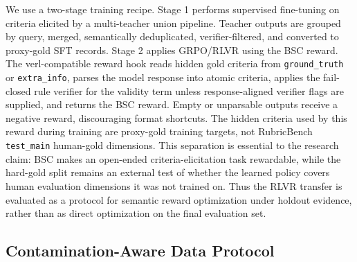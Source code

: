 We use a two-stage training recipe. Stage 1 performs supervised fine-tuning on
criteria elicited by a multi-teacher union pipeline. Teacher outputs are grouped
by query, merged, semantically deduplicated, verifier-filtered, and converted
to proxy-gold SFT records. Stage 2 applies GRPO/RLVR using the BSC reward.
The verl-compatible reward hook reads hidden gold criteria from
\texttt{ground\_truth} or \texttt{extra\_info}, parses the model response into
atomic criteria, applies the fail-closed rule verifier for the validity term
unless response-aligned verifier flags are supplied, and returns the BSC reward.
Empty or unparsable outputs receive a negative reward, discouraging format
shortcuts.
The hidden criteria used by this reward during training are proxy-gold training
targets, not RubricBench \texttt{test\_main} human-gold dimensions. This
separation is essential to the research claim: BSC makes an open-ended
criteria-elicitation task rewardable, while the hard-gold split remains an
external test of whether the learned policy covers human evaluation dimensions
it was not trained on. Thus the RLVR transfer is evaluated as a protocol for
semantic reward optimization under holdout evidence, rather than as direct
optimization on the final evaluation set.

\subsection{Contamination-Aware Data Protocol}

